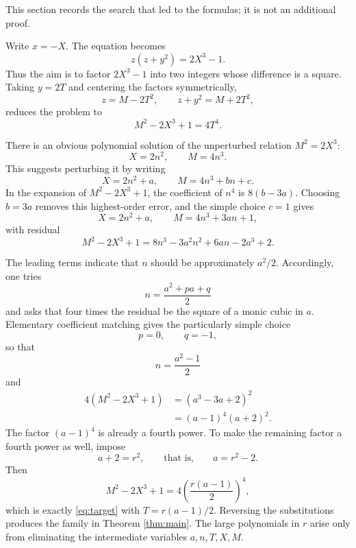 \documentclass[11pt]{article}
\begin{document}
This section records the search that led to the formulas; it is not an
additional proof.

Write \(x=-X\).  The equation becomes
\[
        z(z+y^2)=2X^3-1.
\]
Thus the aim is to factor \(2X^3-1\) into two integers whose difference is
a square.  Taking \(y=2T\) and centering the factors symmetrically,
\[
        z=M-2T^2,\qquad z+y^2=M+2T^2,
\]
reduces the problem to
\begin{equation}\label{eq:target}
        M^2-2X^3+1=4T^4.
\end{equation}

There is an obvious polynomial solution of the unperturbed relation
\(M^2=2X^3\):
\[
        X=2n^2,\qquad M=4n^3.
\]
This suggests perturbing it by writing
\[
        X=2n^2+a,
        \qquad
        M=4n^3+bn+c.
\]
In the expansion of \(M^2-2X^3+1\), the coefficient of \(n^4\) is
\(8(b-3a)\).  Choosing \(b=3a\) removes this highest-order error, and the
simple choice \(c=1\) gives
\[
        X=2n^2+a,
        \qquad
        M=4n^3+3an+1,
\]
with residual
\[
        M^2-2X^3+1
        =8n^3-3a^2n^2+6an-2a^3+2.
\]

The leading terms indicate that \(n\) should be approximately \(a^2/2\).
Accordingly, one tries
\[
        n=\frac{a^2+pa+q}{2}
\]
and asks that four times the residual be the square of a monic cubic in
\(a\).  Elementary coefficient matching gives the particularly simple
choice
\[
        p=0,\qquad q=-1,
\]
so that
\[
        n=\frac{a^2-1}{2}
\]
and
\begin{align*}
 4(M^2-2X^3+1)
   &=(a^3-3a+2)^2\\
   &=(a-1)^4(a+2)^2.
\end{align*}
The factor \((a-1)^4\) is already a fourth power.  To make the remaining
factor a fourth power as well, impose
\[
        a+2=r^2,
        \qquad\text{that is,}\qquad
        a=r^2-2.
\]
Then
\[
        M^2-2X^3+1
        =4\left(\frac{r(a-1)}2\right)^4,
\]
which is exactly \eqref{eq:target} with
\(T=r(a-1)/2\).  Reversing the substitutions produces the family in
Theorem \ref{thm:main}.  The large polynomials in \(r\) arise only from
eliminating the intermediate variables \(a,n,T,X,M\).
\end{document}
